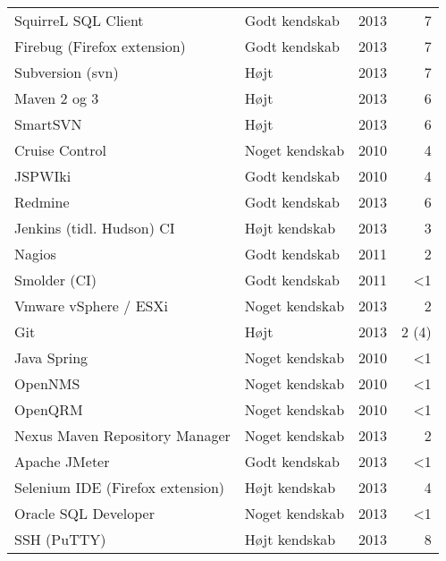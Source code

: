 \documentclass[a4paper,11pt]{article}
\begin{document}
\begin{tabularx}{\textwidth}{X l r r}
  SquirreL SQL Client                     & Godt kendskab   & 2013                  &      7 \\
  Firebug (Firefox extension)             & Godt kendskab   & 2013                  &      7 \\
  Subversion (svn)                        & Højt            & 2013                  &      7 \\
  Maven 2 og 3                            & Højt            & 2013                  &      6 \\
  SmartSVN                                & Højt            & 2013                  &      6 \\
  Cruise Control                          & Noget kendskab  & 2010                  &      4 \\
  JSPWIki                                 & Godt kendskab   & 2010                  &      4 \\
  Redmine                                 & Godt kendskab   & 2013                  &      6 \\
  Jenkins (tidl. Hudson) CI               & Højt kendskab   & 2013                  &      3 \\
  Nagios                                  & Godt kendskab   & 2011                  &      2 \\
  Smolder (CI)                            & Godt kendskab   & 2011                  &     <1 \\
  Vmware vSphere / ESXi                   & Noget kendskab  & 2013                  &      2 \\
  Git                                     & Højt            & 2013                  &   2 (4)\\
  Java Spring                             & Noget kendskab  & 2010                  &     <1 \\
  OpenNMS                                 & Noget kendskab  & 2010                  &     <1 \\
  OpenQRM                                 & Noget kendskab  & 2010                  &     <1 \\
  Nexus Maven Repository Manager          & Noget kendskab  & 2013                  &      2 \\
  Apache JMeter                           & Godt kendskab   & 2013                  &     <1 \\
  Selenium IDE (Firefox extension)        & Højt kendskab   & 2013                  &      4 \\
  Oracle SQL Developer                    & Noget kendskab  & 2013                  &     <1 \\
  SSH (PuTTY)                             & Højt kendskab   & 2013                  &      8 \\
  \hline
\end{tabularx}

\end{document}

